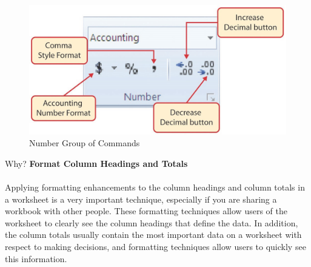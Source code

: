 \begin{figure}[H]
	\centering
	\includegraphics[width=\maxwidth{.95\linewidth}]{gfx/ch01_fig35}
	\caption{Number Group of Commands}
	\label{01:fig35}
\end{figure}

\begin{center}
	\begin{infobox}{Why?}
		\textbf{Format Column Headings and Totals}
		\\
		\\
		Applying formatting enhancements to the column headings and column totals in a worksheet is a very important technique, especially if you are sharing a workbook with other people. These formatting techniques allow users of the worksheet to clearly see the column headings that define the data. In addition, the column totals usually contain the most important data on a worksheet with respect to making decisions, and formatting techniques allow users to quickly see this information.
	\end{infobox}
\end{center}


